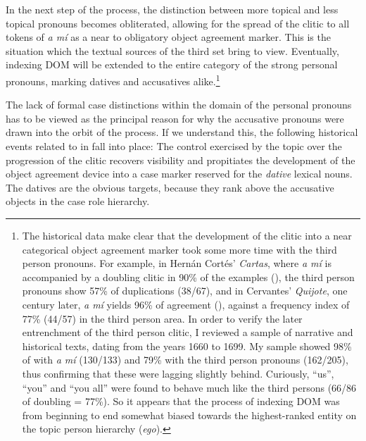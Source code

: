 \documentclass[output=paper]{LSP/langsci}
\begin{document}
 In the next step of the  process, the distinction between more topical and less topical pronouns becomes obliterated, allowing for the spread of the clitic to all tokens of \textit{a mí} as a near to obligatory object agreement marker. This is the situation which the textual sources of the third set bring to view. Eventually, indexing DOM will be extended to the entire category of the strong personal pronouns, marking datives and accusatives alike.\footnote{The historical data make clear that the development of the clitic into a near categorical object agreement marker took some more time with the third person pronouns. For example, in Hernán Cortés’ \textit{Cartas}, where \textit{a mí} is accompanied by a doubling clitic in 90\% of the examples (),  the third person pronouns show 57\% of duplications (38/67), and in Cervantes’ \textit{Quijote}, one century later, \textit{a mí} yields 96\% of agreement (), against a frequency index of 77\% (44/57) in the third person area. In order to verify the later entrenchment of the third person clitic, I reviewed a sample of narrative and historical texts, dating from the years 1660 to 1699. My sample showed 98\% of  with \textit{a mí} (130/133) and 79\% with the third person pronouns (162/205), thus confirming that these were lagging slightly behind. Curiously, “us”, “you” and “you all” were found to behave much like the third persons (66/86 of doubling = 77\%). So it appears that the  process of indexing DOM was from beginning to end somewhat biased towards the highest-ranked entity on the topic person hierarchy (\textit{ego}).} 

 The lack of formal case distinctions within the domain of the  personal pronouns has to be viewed as the principal reason for why the accusative pronouns were drawn into the orbit of the  process. If we understand this, the following historical events related to  in  fall into place: The control exercised by the topic  over the progression of the clitic recovers visibility and propitiates the development of the object agreement device into a case marker reserved for the \textit{dative} lexical nouns. The datives are the obvious targets, because they rank above the accusative objects in the case role hierarchy.
\end{document}
